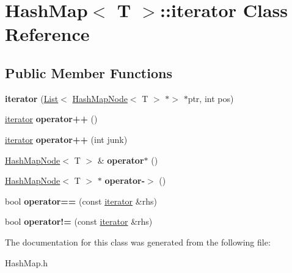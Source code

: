 \hypertarget{class_hash_map_1_1iterator}{}\section{Hash\+Map$<$ T $>$\+:\+:iterator Class Reference}
\label{class_hash_map_1_1iterator}
\subsection*{Public Member Functions}
\begin{DoxyCompactItemize}
\item 
\mbox{\label{class_hash_map_1_1iterator_a4268aa4850fb0e26a43344b003db248f}} 
{\bfseries iterator} (\hyperlink{class_list}{List}$<$ \hyperlink{class_hash_map_node}{Hash\+Map\+Node}$<$ T $>$ $\ast$$>$ $\ast$ptr, int pos)
\item 
\mbox{\label{class_hash_map_1_1iterator_a7123437e1e536467e16e1ea98599c7f5}} 
\hyperlink{class_hash_map_1_1iterator}{iterator} {\bfseries operator++} ()
\item 
\mbox{\label{class_hash_map_1_1iterator_aaf7a65fe250219a86d050fa2cccb6d7e}} 
\hyperlink{class_hash_map_1_1iterator}{iterator} {\bfseries operator++} (int junk)
\item 
\mbox{\label{class_hash_map_1_1iterator_a824634fc39a3050411daaeafe58f0442}} 
\hyperlink{class_hash_map_node}{Hash\+Map\+Node}$<$ T $>$ \& {\bfseries operator$\ast$} ()
\item 
\mbox{\label{class_hash_map_1_1iterator_a4bc46e7139f2f5794f96554608735994}} 
\hyperlink{class_hash_map_node}{Hash\+Map\+Node}$<$ T $>$ $\ast$ {\bfseries operator-\/$>$} ()
\item 
\mbox{\label{class_hash_map_1_1iterator_a2e907e5199b87bb77d0907af0786d79a}} 
bool {\bfseries operator==} (const \hyperlink{class_hash_map_1_1iterator}{iterator} \&rhs)
\item 
\mbox{\label{class_hash_map_1_1iterator_a734f412efdd852a708fcf7237fda6757}} 
bool {\bfseries operator!=} (const \hyperlink{class_hash_map_1_1iterator}{iterator} \&rhs)
\end{DoxyCompactItemize}


The documentation for this class was generated from the following file\+:\begin{DoxyCompactItemize}
\item 
Hash\+Map.\+h\end{DoxyCompactItemize}
